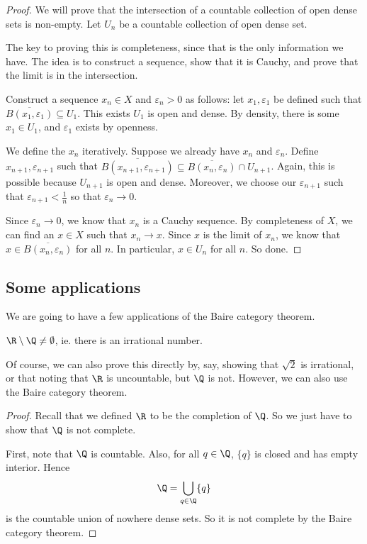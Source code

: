 \documentclass[a4paper]{article}
\begin{document}
\begin{proof}
  We will prove that the intersection of a countable collection of open dense sets is non-empty. Let $U_n$ be a countable collection of open dense set.

  The key to proving this is completeness, since that is the only information we have. The idea is to construct a sequence, show that it is Cauchy, and prove that the limit is in the intersection.

  Construct a sequence $x_n \in X$ and $\varepsilon_n > 0$ as follows: let $x_1, \varepsilon_1$ be defined such that $\overline{B(x_1, \varepsilon_1)} \subseteq U_1$. This exists $U_1$ is open and dense. By density, there is some $x_1 \in U_1$, and $\varepsilon_1$ exists by openness.

  We define the $x_n$ iteratively. Suppose we already have $x_n$ and $\varepsilon_n$. Define $x_{n + 1}, \varepsilon_{n + 1}$ such that $\overline{B(x_{n + 1}, \varepsilon_{n + 1})} \subseteq \overline{B(x_n, \varepsilon_n)}\cap U_{n + 1}$. Again, this is possible because $U_{n + 1}$ is open and dense. Moreover, we choose our $\varepsilon_{n + 1}$ such that $\varepsilon_{n + 1} < \frac{1}{n}$ so that $\varepsilon_n \to 0$.

  Since $\varepsilon_n \to 0$, we know that $x_n$ is a Cauchy sequence. By completeness of $X$, we can find an $x\in X$ such that $x_n \to x$. Since $x$ is the limit of $x_n$, we know that $x\in \overline{B(x_n, \varepsilon_n)}$ for all $n$. In particular, $x\in U_n$ for all $n$. So done.
\end{proof}

\subsection{Some applications}
We are going to have a few applications of the Baire category theorem.

\begin{prop}
  $\R \setminus \Q \not= \emptyset$, ie. there is an irrational number.
\end{prop}
Of course, we can also prove this directly by, say, showing that $\sqrt{2}$ is irrational, or that noting that $\R$ is uncountable, but $\Q$ is not. However, we can also use the Baire category theorem.

\begin{proof}
  Recall that we defined $\R$ to be the completion of $\Q$. So we just have to show that $\Q$ is not complete.

  First, note that $\Q$ is countable. Also, for all $q \in \Q$, $\{q\}$ is closed and has empty interior. Hence
  \[
    \Q = \bigcup_{q \in \Q}\{q\}
  \]
  is the countable union of nowhere dense sets. So it is not complete by the Baire category theorem.
\end{proof}
\end{document}
